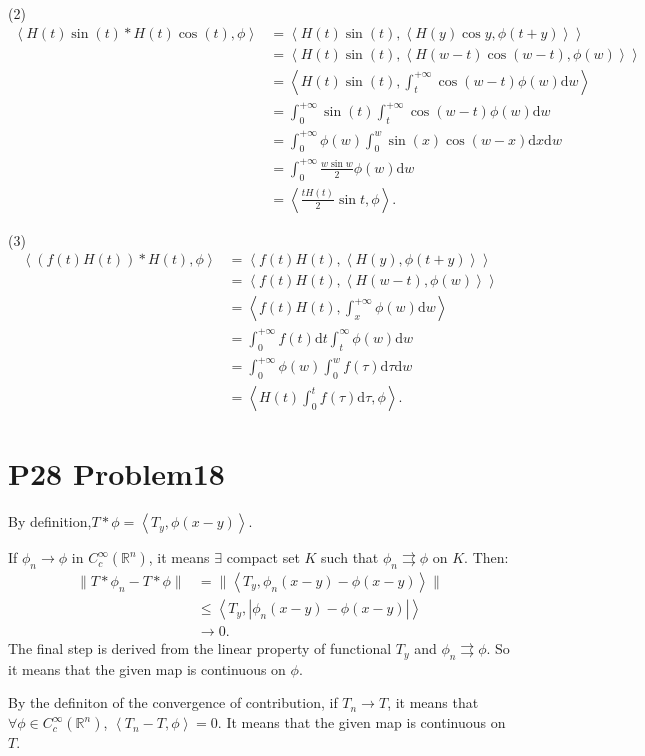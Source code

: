 \documentclass[a4paper]{ctexart}
\newcommand{\dif}{\mathrm{d}}
\newcommand{\innerprod}[2]{\left<#1,#2\right>}
\begin{document}
(2)
\begin{equation}
    \begin{aligned}
        \innerprod{H(t)\sin(t)*H(t)\cos(t)}{\phi}&=\innerprod{H(t)\sin(t)}{\innerprod{H(y)\cos y}{\phi(t+y)}}\\
        &=\innerprod{H(t)\sin(t)}{\innerprod{H(w-t)\cos(w-t)}{\phi(w)}}\\
        &=\innerprod{H(t)\sin(t)}{\int_{t}^{+\infty}\cos(w-t)\phi(w)\dif w}\\
        &=\int_{0}^{+\infty}\sin(t)\int_{t}^{+\infty}\cos(w-t)\phi(w)\dif w\\
        &=\int_{0}^{+\infty}\phi(w)\int_{0}^{w}\sin(x)\cos(w-x)\dif x\dif w\\
        &=\int_{0}^{+\infty}\frac{w\sin w}{2}\phi(w)\dif w\\
        &=\innerprod{\frac{tH(t)}{2}\sin t}{\phi}.        
    \end{aligned}
\end{equation}

(3)
\begin{equation}
    \begin{aligned}
        \innerprod{(f(t)H(t))*H(t)}{\phi}&=\innerprod{f(t)H(t)}{\innerprod{H(y)}{\phi(t+y)}}\\
        &=\innerprod{f(t)H(t)}{\innerprod{H(w-t)}{\phi(w)}}\\
        &=\innerprod{f(t)H(t)}{\int_{x}^{+\infty}\phi(w)\dif w}\\
        &=\int_{0}^{+\infty}f(t)\dif t\int_{t}^{\infty}\phi(w)\dif w\\
        &=\int_{0}^{+\infty}\phi(w)\int_{0}^{w}f(\tau)\dif\tau\dif w\\
        &=\innerprod{H(t)\int_{0}^{t}f(\tau)\dif\tau}{\phi}.
    \end{aligned}
\end{equation}
\section*{P28 Problem18}
By definition,$T*\phi=\innerprod{T_{y}}{\phi(x-y)}$.

If $\phi_{n}\rightarrow\phi$ in $C_{c}^{\infty}(\mathbb{R}^{n})$, it means $\exists$ compact set $K$ such that $\phi_{n}\rightrightarrows\phi$ on $K$. Then:
\begin{equation}
    \begin{aligned}
        \|T*\phi_{n}-T*\phi\|
        &=\|\innerprod{T_{y}}{\phi_{n}(x-y)-\phi(x-y)}\|\\
        &\le\innerprod{T_{y}}{|\phi_{n}(x-y)-\phi(x-y)|}\\
        &\rightarrow 0.
    \end{aligned}
\end{equation}
The final step is derived from the linear property of functional $T_{y}$ and $\phi_{n}\rightrightarrows\phi$. So it means that the given map is continuous on $\phi$.

By the definiton of the convergence of contribution, if $T_{n}\rightarrow T$, it means that $\forall \phi\in C_{c}^{\infty}(\mathbb{R}^{n})$, $\innerprod{T_{n}-T}{\phi}=0$. It means that the given map is continuous on $T$.
\end{document}
